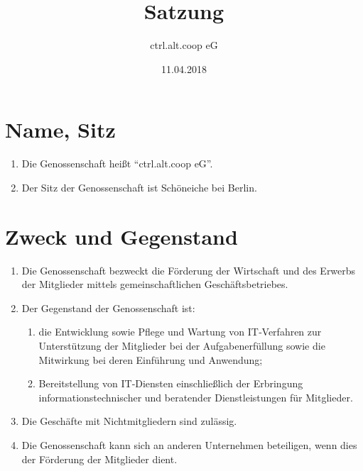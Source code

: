 \documentclass[a4paper, 12pt]{scrartcl}
\title{Satzung}
\subtitle{ctrl.alt.coop eG}
\author{}
\date{11.04.2018}
\begin{document}
\maketitle
\sffamily
\tableofcontents

\newpage
\section{Name, Sitz}
\begin{enumerate}
  \item Die Genossenschaft heißt \enquote{ctrl.alt.coop eG}.
  \item Der Sitz der Genossenschaft ist Schöneiche bei Berlin.
\end{enumerate}

\section{Zweck und Gegenstand}
\begin{enumerate}
  \item Die Genossenschaft bezweckt die Förderung der Wirtschaft und des Erwerbs der Mitglieder mittels gemeinschaftlichen Geschäftsbetriebes.
  \item Der Gegenstand der Genossenschaft ist:
  \begin{enumerate}
    \item die Entwicklung sowie Pflege und Wartung von IT‐Verfahren zur Unterstützung der Mitglieder bei der Aufgabenerfüllung sowie die Mitwirkung bei deren Einführung und Anwendung;
    \item Bereitstellung von IT‐Diensten einschließlich der Erbringung informationstechnischer und beratender Dienstleistungen für Mitglieder.
  \end{enumerate}
  \item Die Geschäfte mit Nichtmitgliedern sind zulässig.
  \item Die Genossenschaft kann sich an anderen Unternehmen beteiligen, wenn dies der Förderung der Mitglieder dient.
\end{enumerate}
\end{document}
